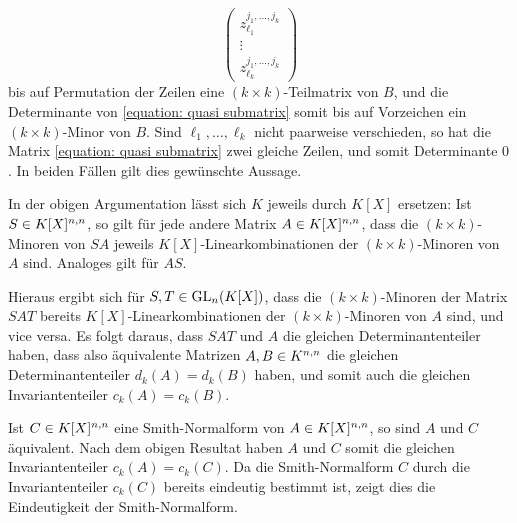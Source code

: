 \begin{equation}
  \label{equation: quasi submatrix}
    \begin{pmatrix}
      z_{\ell_1}^{j_1, \dotsc, j_k} \\
      \vdots                        \\
      z_{\ell_k}^{j_1, \dotsc, j_k}
    \end{pmatrix}
\end{equation}
bis auf Permutation der Zeilen eine $(k \times k)$-Teilmatrix von $B$, und die Determinante von \eqref{equation: quasi submatrix} somit bis auf Vorzeichen ein $(k \times k)$-Minor von $B$.
Sind $\ell_1, \dotsc, \ell_k$ nicht paarweise verschieden, so hat die Matrix \eqref{equation: quasi submatrix} zwei gleiche Zeilen, und somit Determinante $0$.
In beiden Fällen gilt dies gewünschte Aussage.

\begin{remark}
  In der obigen Argumentation lässt sich $K$ jeweils durch $K[X]$ ersetzen:
  Ist $S \in \matrices{n}{K[X]}$, so gilt für jede andere Matrix $A \in \matrices{n}{K[X]}$, dass die $(k \times k)$-Minoren von $SA$ jeweils $K[X]$-Linearkombinationen der $(k \times k)$-Minoren von $A$ sind.
  Analoges gilt für $AS$.
  
  Hieraus ergibt sich für $S, T \in \GL{n}{K[X]}$, dass die $(k \times k)$-Minoren der Matrix $SAT$ bereits $K[X]$-Linearkombinationen der $(k \times k)$-Minoren von $A$ sind, und vice versa.
  Es folgt daraus, dass $SAT$ und $A$ die gleichen Determinantenteiler haben, dass also äquivalente Matrizen $A, B \in \matrices{n}{K}$ die gleichen Determinantenteiler $d_k(A) = d_k(B)$ haben, und somit auch die gleichen Invariantenteiler $c_k(A) = c_k(B)$.
  
  Ist $C \in \matrices{n}{K[X]}$ eine Smith-Normalform von $A \in \matrices{n}{K[X]}$, so sind $A$ und $C$ äquivalent.
  Nach dem obigen Resultat haben $A$ und $C$ somit die gleichen Invariantenteiler $c_k(A) = c_k(C)$.
  Da die Smith-Normalform $C$ durch die Invariantenteiler $c_k(C)$ bereits eindeutig bestimmt ist, zeigt dies die Eindeutigkeit der Smith-Normalform.
\end{remark}


